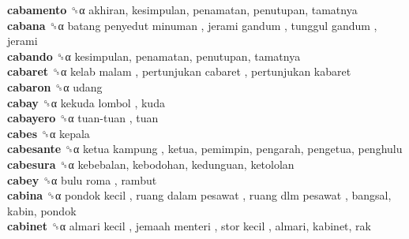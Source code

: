 \textbf{cabamento} ␝α  akhiran, kesimpulan, penamatan, penutupan, tamatnya  \\
\textbf{cabana} ␝α   batang penyedut minuman ,  jerami gandum ,  tunggul gandum , jerami  \\
\textbf{cabando} ␝α  kesimpulan, penamatan, penutupan, tamatnya  \\
\textbf{cabaret} ␝α   kelab malam ,  pertunjukan cabaret ,  pertunjukan kabaret   \\
\textbf{cabaron} ␝α  udang  \\
\textbf{cabay} ␝α   kekuda lombol , kuda  \\
\textbf{cabayero} ␝α   tuan-tuan , tuan  \\
\textbf{cabes} ␝α  kepala  \\
\textbf{cabesante} ␝α   ketua kampung , ketua, pemimpin, pengarah, pengetua, penghulu  \\
\textbf{cabesura} ␝α  kebebalan, kebodohan, kedunguan, ketololan  \\
\textbf{cabey} ␝α   bulu roma , rambut  \\
\textbf{cabina} ␝α   pondok kecil ,  ruang dalam pesawat ,  ruang dlm pesawat , bangsal, kabin, pondok  \\
\textbf{cabinet} ␝α   almari kecil ,  jemaah menteri ,  stor kecil , almari, kabinet, rak  \\
